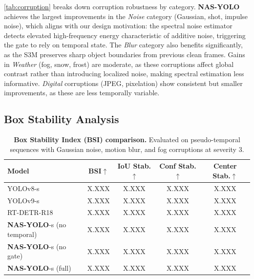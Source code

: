 \documentclass[review]{eccv2026}
\newcommand{\ours}{\textbf{NAS-YOLO}}
\newcommand{\nasSbsi}{X.XXX}
\newcommand{\yoloEightSbsi}{X.XXX}
\newcommand{\yoloNineSbsi}{X.XXX}
\newcommand{\rtdetrBsi}{X.XXX}
\newcommand{\nasSIoUStab}{X.XXX}
\newcommand{\nasSConfStab}{X.XXX}
\newcommand{\nasSCenterStab}{X.XXX}
\newcommand{\yoloEightSIoUStab}{X.XXX}
\newcommand{\yoloEightSConfStab}{X.XXX}
\newcommand{\yoloEightSCenterStab}{X.XXX}
\newcommand{\yoloNineSIoUStab}{X.XXX}
\newcommand{\yoloNineSConfStab}{X.XXX}
\newcommand{\yoloNineSCenterStab}{X.XXX}
\newcommand{\rtdetrIoUStab}{X.XXX}
\newcommand{\rtdetrConfStab}{X.XXX}
\newcommand{\rtdetrCenterStab}{X.XXX}
\newcommand{\nasNoTempBsi}{X.XXX}
\newcommand{\nasNoTempIoU}{X.XXX}
\newcommand{\nasNoTempConf}{X.XXX}
\newcommand{\nasNoTempCenter}{X.XXX}
\newcommand{\nasNoGateBsi}{X.XXX}
\newcommand{\nasNoGateIoU}{X.XXX}
\newcommand{\nasNoGateConf}{X.XXX}
\newcommand{\nasNoGateCenter}{X.XXX}
\begin{document}
\cref{tab:corruption} breaks down corruption robustness by category.
\ours{} achieves the largest improvements in the \textit{Noise} category (Gaussian, shot, impulse noise), which aligns with our design motivation: the spectral noise estimator detects elevated high-frequency energy characteristic of additive noise, triggering the gate to rely on temporal state.
The \textit{Blur} category also benefits significantly, as the S3M preserves sharp object boundaries from previous clean frames.
Gains in \textit{Weather} (fog, snow, frost) are moderate, as these corruptions affect global contrast rather than introducing localized noise, making spectral estimation less informative.
\textit{Digital} corruptions (JPEG, pixelation) show consistent but smaller improvements, as these are less temporally variable.


\subsection{Box Stability Analysis}

\begin{table}[t]
  \centering
  \caption{\textbf{Box Stability Index (BSI) comparison.} Evaluated on pseudo-temporal sequences with Gaussian noise, motion blur, and fog corruptions at severity 3.}
  \label{tab:stability}
  \vspace{4pt}
  \small
  \begin{tabular}{l|cccc}
    \toprule
    \textbf{Model} & \textbf{BSI}$\uparrow$ & \textbf{IoU Stab.}$\uparrow$ & \textbf{Conf Stab.}$\uparrow$ & \textbf{Center Stab.}$\uparrow$ \\
    \midrule
    YOLOv8-s & \yoloEightSbsi & \yoloEightSIoUStab & \yoloEightSConfStab & \yoloEightSCenterStab \\
    YOLOv9-s & \yoloNineSbsi & \yoloNineSIoUStab & \yoloNineSConfStab & \yoloNineSCenterStab \\
    RT-DETR-R18 & \rtdetrBsi & \rtdetrIoUStab & \rtdetrConfStab & \rtdetrCenterStab \\
    \midrule
    \ours{}-s (no temporal) & \nasNoTempBsi & \nasNoTempIoU & \nasNoTempConf & \nasNoTempCenter \\
    \ours{}-s (no gate) & \nasNoGateBsi & \nasNoGateIoU & \nasNoGateConf & \nasNoGateCenter \\
    \rowcolor{bestcolor} \ours{}-s (full) & \nasSbsi & \nasSIoUStab & \nasSConfStab & \nasSCenterStab \\
    \bottomrule
  \end{tabular}
\end{table}
\end{document}
